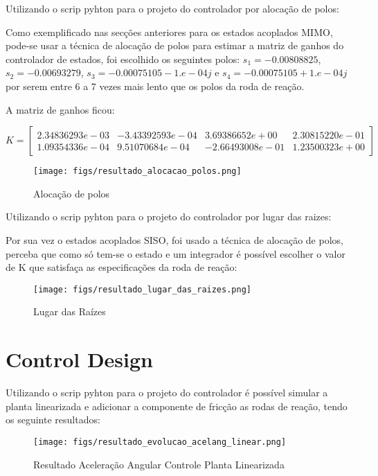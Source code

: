 Utilizando o scrip pyhton para o projeto do controlador por alocação de polos:

Como exemplificado nas secções anteriores para os estados acoplados MIMO, pode-se usar a técnica de alocação de polos para estimar a matriz de ganhos do controlador de estados, foi escolhido os seguintes polos:
$s_1 = -0.00808825$, $s_2=-0.00693279$, $s_3=-0.00075105-1.e-04j$ e $s_4=-0.00075105+1.e-04j$ por serem entre 6 a 7 vezes mais lento que os polos da roda de reação.

A matriz de ganhos ficou: 

\begin{equation}
	K = \begin{bmatrix}
		 2.34836293e-03 & -3.43392593e-04 & 3.69386652e+00 & 2.30815220e-01 \\
		 1.09354336e-04 & 9.51070684e-04 & -2.66493008e-01 & 1.23500323e+00
	\end{bmatrix}
\end{equation}


\begin{figure}[htpb]
	\centering
	\texttt{[image: figs/resultado\_alocacao\_polos.png]}
	\caption{Alocação de polos}
	\label{fig:15}
\end{figure}

Utilizando o scrip pyhton para o projeto do controlador por lugar das raizes:

Por sua vez o estados acoplados SISO, foi usado a técnica de alocação de polos, perceba que como só tem-se o estado e um integrador é possível escolher o valor de K que satisfaça as especificações da roda de reação:

\begin{figure}[htpb]
	\centering
	\texttt{[image: figs/resultado\_lugar\_das\_raizes.png]}
	\caption{Lugar das Raízes}
	\label{fig:15}
\end{figure}

\section{Control Design}

Utilizando o scrip pyhton para o projeto do controlador é possível simular a planta linearizada e adicionar a componente de fricção as rodas de reação, tendo os seguinte resultados:


\begin{figure}[htpb]
	\centering
	\texttt{[image: figs/resultado\_evolucao\_acelang\_linear.png]}
	\caption{Resultado Aceleração Angular Controle Planta Linearizada}
	\label{fig:15}
\end{figure}

